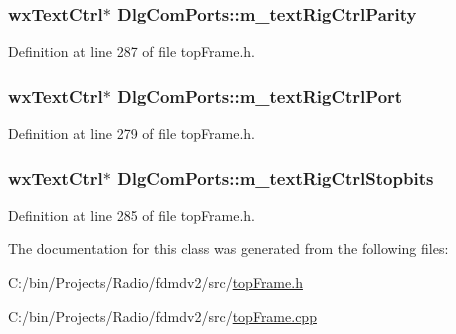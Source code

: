 \hypertarget{class_dlg_com_ports_a807f268b9b09eece038789b3b57eda1c}{
\subsubsection[{m\-\_\-text\-Rig\-Ctrl\-Parity}]{\setlength{\rightskip}{0pt plus 5cm}wx\-Text\-Ctrl$\ast$ Dlg\-Com\-Ports\-::m\-\_\-text\-Rig\-Ctrl\-Parity\hspace{0.3cm}{\ttfamily [protected]}}}\label{class_dlg_com_ports_a807f268b9b09eece038789b3b57eda1c}


Definition at line 287 of file top\-Frame.\-h.

\hypertarget{class_dlg_com_ports_ac9be845d35a7303c5ac404e892f10ffb}{
\subsubsection[{m\-\_\-text\-Rig\-Ctrl\-Port}]{\setlength{\rightskip}{0pt plus 5cm}wx\-Text\-Ctrl$\ast$ Dlg\-Com\-Ports\-::m\-\_\-text\-Rig\-Ctrl\-Port\hspace{0.3cm}{\ttfamily [protected]}}}\label{class_dlg_com_ports_ac9be845d35a7303c5ac404e892f10ffb}


Definition at line 279 of file top\-Frame.\-h.

\hypertarget{class_dlg_com_ports_a1bf803269da16b3f56c2c5bd21ba484b}{
\subsubsection[{m\-\_\-text\-Rig\-Ctrl\-Stopbits}]{\setlength{\rightskip}{0pt plus 5cm}wx\-Text\-Ctrl$\ast$ Dlg\-Com\-Ports\-::m\-\_\-text\-Rig\-Ctrl\-Stopbits\hspace{0.3cm}{\ttfamily [protected]}}}\label{class_dlg_com_ports_a1bf803269da16b3f56c2c5bd21ba484b}


Definition at line 285 of file top\-Frame.\-h.



The documentation for this class was generated from the following files\-:\begin{DoxyCompactItemize}
\item 
C\-:/bin/\-Projects/\-Radio/fdmdv2/src/\hyperlink{top_frame_8h}{top\-Frame.\-h}\item 
C\-:/bin/\-Projects/\-Radio/fdmdv2/src/\hyperlink{top_frame_8cpp}{top\-Frame.\-cpp}\end{DoxyCompactItemize}
